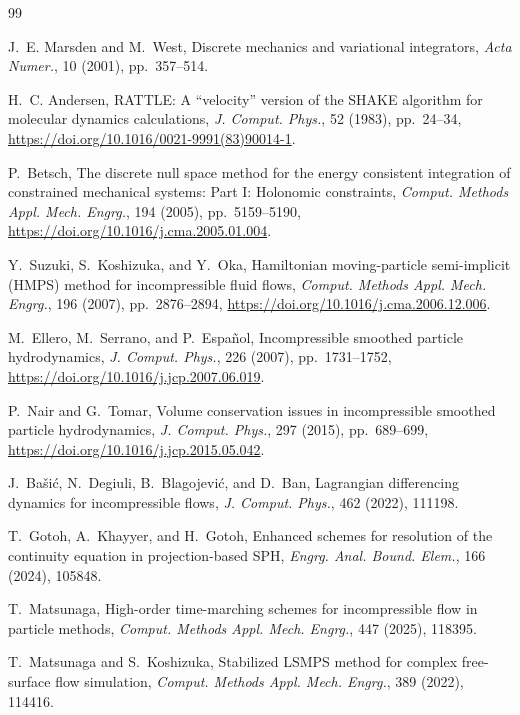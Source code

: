 \documentclass[11pt]{article}
\theoremstyle{plain}
\theoremstyle{definition}
\theoremstyle{remark}
\begin{document}
\begin{thebibliography}{99}


J.~E. Marsden and M.~West,
Discrete mechanics and variational integrators,
\emph{Acta Numer.}, 10 (2001), pp.~357--514.

H.~C. Andersen,
RATTLE: A ``velocity'' version of the SHAKE algorithm for molecular dynamics
calculations,
\emph{J. Comput. Phys.}, 52 (1983), pp.~24--34,
\url{https://doi.org/10.1016/0021-9991(83)90014-1}.

P.~Betsch,
The discrete null space method for the energy consistent integration of
constrained mechanical systems: Part I: Holonomic constraints,
\emph{Comput. Methods Appl. Mech. Engrg.}, 194 (2005), pp.~5159--5190,
\url{https://doi.org/10.1016/j.cma.2005.01.004}.

Y.~Suzuki, S.~Koshizuka, and Y.~Oka,
Hamiltonian moving-particle semi-implicit (HMPS) method for incompressible
fluid flows,
\emph{Comput. Methods Appl. Mech. Engrg.}, 196 (2007), pp.~2876--2894,
\url{https://doi.org/10.1016/j.cma.2006.12.006}.


M.~Ellero, M.~Serrano, and P.~Espa\~nol,
Incompressible smoothed particle hydrodynamics,
\emph{J. Comput. Phys.}, 226 (2007), pp.~1731--1752,
\url{https://doi.org/10.1016/j.jcp.2007.06.019}.

P.~Nair and G.~Tomar,
Volume conservation issues in incompressible smoothed particle hydrodynamics,
\emph{J. Comput. Phys.}, 297 (2015), pp.~689--699,
\url{https://doi.org/10.1016/j.jcp.2015.05.042}.

J.~Ba\v{s}i\'c, N.~Degiuli, B.~Blagojevi\'c, and D.~Ban,
Lagrangian differencing dynamics for incompressible flows,
\emph{J. Comput. Phys.}, 462 (2022), 111198.

T.~Gotoh, A.~Khayyer, and H.~Gotoh,
Enhanced schemes for resolution of the continuity equation in
projection-based SPH,
\emph{Engrg. Anal. Bound. Elem.}, 166 (2024), 105848.

T.~Matsunaga,
High-order time-marching schemes for incompressible flow in particle methods,
\emph{Comput. Methods Appl. Mech. Engrg.}, 447 (2025), 118395.

T.~Matsunaga and S.~Koshizuka,
Stabilized LSMPS method for complex free-surface flow simulation,
\emph{Comput. Methods Appl. Mech. Engrg.}, 389 (2022), 114416.


\end{thebibliography}
\end{document}

